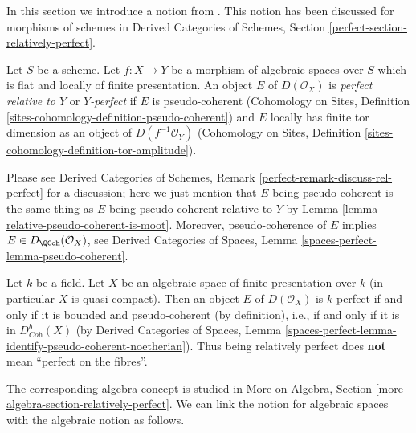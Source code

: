 \noindent
In this section we introduce a notion from \cite{lieblich-complexes}.
This notion has been discussed for morphisms of schemes in
Derived Categories of Schemes, Section
\ref{perfect-section-relatively-perfect}.

\begin{definition}
\label{definition-relatively-perfect}
Let $S$ be a scheme. Let $f : X \to Y$ be a morphism of algebraic spaces
over $S$ which is flat and locally of finite presentation.
An object $E$ of $D(\mathcal{O}_X)$ is {\it perfect relative to $Y$} or
{\it $Y$-perfect} if $E$ is pseudo-coherent
(Cohomology on Sites, Definition
\ref{sites-cohomology-definition-pseudo-coherent}) and
$E$ locally has finite tor dimension as an object of
$D(f^{-1}\mathcal{O}_Y)$
(Cohomology on Sites, Definition
\ref{sites-cohomology-definition-tor-amplitude}).
\end{definition}

\noindent
Please see Derived Categories of Schemes,
Remark \ref{perfect-remark-discuss-rel-perfect} for a discussion;
here we just mention that $E$ being pseudo-coherent is the
same thing as $E$ being pseudo-coherent relative to $Y$ by
Lemma \ref{lemma-relative-pseudo-coherent-is-moot}.
Moreover, pseudo-coherence of $E$ implies $E \in D_\QCoh(\mathcal{O}_X)$, see
Derived Categories of Spaces, Lemma
\ref{spaces-perfect-lemma-pseudo-coherent}.

\begin{example}
\label{example-relatively-perfect-field}
Let $k$ be a field. Let $X$ be an algebraic space of finite presentation
over $k$ (in particular $X$ is quasi-compact). Then an object $E$ of
$D(\mathcal{O}_X)$ is $k$-perfect if and only if it is bounded and
pseudo-coherent (by definition), i.e., if and only if it is in
$D^b_{\textit{Coh}}(X)$ (by
Derived Categories of Spaces, Lemma
\ref{spaces-perfect-lemma-identify-pseudo-coherent-noetherian}).
Thus being relatively perfect does {\bf not} mean ``perfect on the fibres''.
\end{example}

\noindent
The corresponding algebra concept is studied in
More on Algebra, Section \ref{more-algebra-section-relatively-perfect}.
We can link the notion for algebraic spaces with the
algebraic notion as follows.


